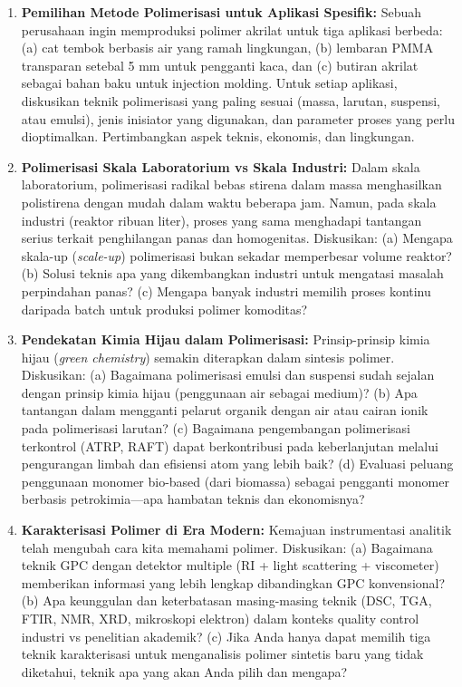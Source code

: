 \documentclass[12pt,a4paper,openany]{book}
\begin{document}
\begin{enumerate}

\item \textbf{Pemilihan Metode Polimerisasi untuk Aplikasi Spesifik:} Sebuah perusahaan ingin memproduksi polimer akrilat untuk tiga aplikasi berbeda: (a) cat tembok berbasis air yang ramah lingkungan, (b) lembaran PMMA transparan setebal 5 mm untuk pengganti kaca, dan (c) butiran akrilat sebagai bahan baku untuk injection molding. Untuk setiap aplikasi, diskusikan teknik polimerisasi yang paling sesuai (massa, larutan, suspensi, atau emulsi), jenis inisiator yang digunakan, dan parameter proses yang perlu dioptimalkan. Pertimbangkan aspek teknis, ekonomis, dan lingkungan.

\item \textbf{Polimerisasi Skala Laboratorium vs Skala Industri:} Dalam skala laboratorium, polimerisasi radikal bebas stirena dalam massa menghasilkan polistirena dengan mudah dalam waktu beberapa jam. Namun, pada skala industri (reaktor ribuan liter), proses yang sama menghadapi tantangan serius terkait penghilangan panas dan homogenitas. Diskusikan: (a) Mengapa skala-up (\textit{scale-up}) polimerisasi bukan sekadar memperbesar volume reaktor? (b) Solusi teknis apa yang dikembangkan industri untuk mengatasi masalah perpindahan panas? (c) Mengapa banyak industri memilih proses kontinu daripada batch untuk produksi polimer komoditas?

\item \textbf{Pendekatan Kimia Hijau dalam Polimerisasi:} Prinsip-prinsip kimia hijau (\textit{green chemistry}) semakin diterapkan dalam sintesis polimer. Diskusikan: (a) Bagaimana polimerisasi emulsi dan suspensi sudah sejalan dengan prinsip kimia hijau (penggunaan air sebagai medium)? (b) Apa tantangan dalam mengganti pelarut organik dengan air atau cairan ionik pada polimerisasi larutan? (c) Bagaimana pengembangan polimerisasi terkontrol (ATRP, RAFT) dapat berkontribusi pada keberlanjutan melalui pengurangan limbah dan efisiensi atom yang lebih baik? (d) Evaluasi peluang penggunaan monomer bio-based (dari biomassa) sebagai pengganti monomer berbasis petrokimia---apa hambatan teknis dan ekonomisnya?

\item \textbf{Karakterisasi Polimer di Era Modern:} Kemajuan instrumentasi analitik telah mengubah cara kita memahami polimer. Diskusikan: (a) Bagaimana teknik GPC dengan detektor multiple (RI + light scattering + viscometer) memberikan informasi yang lebih lengkap dibandingkan GPC konvensional? (b) Apa keunggulan dan keterbatasan masing-masing teknik (DSC, TGA, FTIR, NMR, XRD, mikroskopi elektron) dalam konteks quality control industri vs penelitian akademik? (c) Jika Anda hanya dapat memilih tiga teknik karakterisasi untuk menganalisis polimer sintetis baru yang tidak diketahui, teknik apa yang akan Anda pilih dan mengapa?

\end{enumerate}
\end{document}
